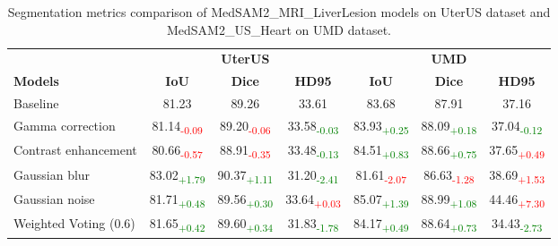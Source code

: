 \documentclass{article}
\begin{document}
\begin{table}[t]
\centering
\caption{Segmentation metrics comparison of MedSAM2\_MRI\_LiverLesion models on UterUS \cite{bones2024uterus} dataset and MedSAM2\_US\_Heart on UMD\cite{umd2024} dataset.}
\begin{tabular}{lccc|ccc}
\toprule
 & \multicolumn{3}{c}{\textbf{UterUS}} & \multicolumn{3}{c}{\textbf{UMD}} \\
\cmidrule(lr){2-4} 
\cmidrule(lr){5-7} 
 \textbf{Models} & \textbf{IoU} & \textbf{Dice} & \textbf{HD95} & \textbf{IoU} & \textbf{Dice} & \textbf{HD95} \\
\midrule
Baseline & 81.23 & 89.26 & 33.61 & 83.68 & 87.91 & 37.16 \\
Gamma correction  
         & 81.14\textsubscript{\textcolor{red}{-0.09}} 
         & 89.20\textsubscript{\textcolor{red}{-0.06}} 
         & 33.58\textsubscript{\textcolor{green}{-0.03}} 
         & 83.93\textsubscript{\textcolor{green}{+0.25}}
         & 88.09\textsubscript{\textcolor{green}{+0.18}}
         & 37.04\textsubscript{\textcolor{green}{-0.12}}\\

Contrast enhancement 
		 & 80.66\textsubscript{\textcolor{red}{-0.57}} 
         & 88.91\textsubscript{\textcolor{red}{-0.35}} 
         & 33.48\textsubscript{\textcolor{green}{-0.13}}
         & 84.51\textsubscript{\textcolor{green}{+0.83}}
         & 88.66\textsubscript{\textcolor{green}{+0.75}}
         & 37.65\textsubscript{\textcolor{red}{+0.49}}\\
Gaussian blur 
		 & 83.02\textsubscript{\textcolor{green}{+1.79}} 
         & 90.37\textsubscript{\textcolor{green}{+1.11}} 
         & 31.20\textsubscript{\textcolor{green}{-2.41}}
         & 81.61\textsubscript{\textcolor{red}{-2.07}}
         & 86.63\textsubscript{\textcolor{red}{-1.28}}
         & 38.69\textsubscript{\textcolor{red}{+1.53}}\\

Gaussian noise 
		 & 81.71\textsubscript{\textcolor{green}{+0.48}} 
         & 89.56\textsubscript{\textcolor{green}{+0.30}} 
         & 33.64\textsubscript{\textcolor{red}{+0.03}}
         & 85.07\textsubscript{\textcolor{green}{+1.39}}
         & 88.99\textsubscript{\textcolor{green}{+1.08}}
         & 44.46\textsubscript{\textcolor{red}{+7.30}}\\
\midrule
Weighted Voting (0.6)
		 & 81.65\textsubscript{\textcolor{green}{+0.42}} 
         & 89.60\textsubscript{\textcolor{green}{+0.34}} 
         & 31.83\textsubscript{\textcolor{green}{-1.78}}
         & 84.17\textsubscript{\textcolor{green}{+0.49}}
         & 88.64\textsubscript{\textcolor{green}{+0.73}}
         & 34.43\textsubscript{\textcolor{green}{-2.73}}\\
\bottomrule
\end{tabular}
\label{tab:UterUS_UMD_TTA_results}
\end{table}
\end{document}
